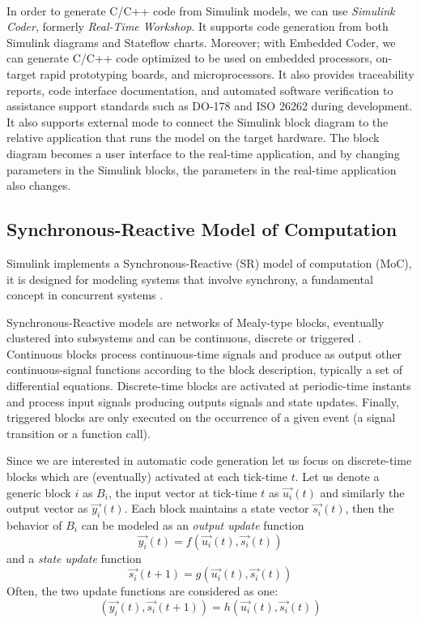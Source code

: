 \paragraph{} In order to generate C/C++ code from Simulink models, we can use \emph{Simulink Coder}\textregistered, formerly \emph{Real-Time Workshop}\textregistered. It supports code generation from both Simulink diagrams and Stateflow charts. Moreover; with Embedded Coder\textregistered, we can generate C/C++ code optimized to be used on embedded processors, on-target rapid prototyping boards, and microprocessors. It also provides traceability reports, code interface documentation, and automated software verification to assistance support standards such as DO-178 and ISO 26262 during development. It also supports external mode to connect the Simulink block diagram to the relative application that runs the model on the target hardware. The block diagram becomes a user interface to the real-time application, and by changing parameters in the Simulink blocks, the parameters in the real-time application also changes.

\subsection{Synchronous-Reactive Model of Computation}
Simulink implements a Synchronous-Reactive (SR) model of computation (MoC), it is designed for modeling systems that involve synchrony, a fundamental concept in concurrent systems \cite{Ptolemy2}. 
\par Synchronous-Reactive models are networks of Mealy-type blocks, eventually clustered into subsystems and can be continuous, discrete or triggered \cite{tres}. Continuous blocks process continuous-time signals and produce as output other continuous-signal functions according to the block description, typically a set of differential equations. Discrete-time blocks are activated at periodic-time instants and process input signals producing outputs signals and state updates. Finally, triggered blocks are only executed on the occurrence of a given event (a signal transition or a function call). 
\par Since we are interested in automatic code generation let us focus on discrete-time blocks which are (eventually) activated at each tick-time $t$. Let us denote a generic block $i$ as $B_i$, the input vector at tick-time $t$ as $\vec{u_i}(t)$ and similarly the output vector as $\vec{y_i}(t)$. Each block maintains a state vector $\vec{s_i}(t)$, then the behavior of $B_i$ can be modeled as an \emph{output update} function
\begin{equation}
\vec{y_i}(t)=f(\vec{u_i}(t),\vec{s_i}(t))
\end{equation}
and a \emph{state update} function
\begin{equation}
\vec{s_i}(t+1) = g(\vec{u_i}(t), \vec{s_i}(t))
\end{equation}
Often, the two update functions are considered as one:
\begin{equation}
(\vec{y_i}(t), \vec{s_i}(t+1)) = h(\vec{u_i}(t),\vec{s_i}(t))
\end{equation}

